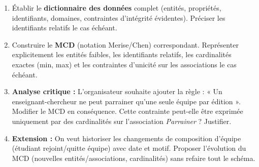 \documentclass[11pt]{article}
\begin{document}
\begin{exercice}
\begin{enumerate}
    \item Établir le \textbf{dictionnaire des données} complet (entités, propriétés, identifiants, domaines, contraintes d'intégrité évidentes). Préciser les identifiants relatifs le cas échéant.
    \item Construire le \textbf{MCD} (notation Merise/Chen) correspondant. Représenter explicitement les entités faibles, les identifiants relatifs, les cardinalités exactes (min, max) et les contraintes d'unicité sur les associations le cas échéant.
    \item \textbf{Analyse critique :} L'organisateur souhaite ajouter la règle : « Un enseignant-chercheur ne peut parrainer qu'une seule équipe par édition ». Modifier le MCD en conséquence. Cette contrainte peut-elle être exprimée uniquement par des cardinalités sur l'association \textit{Parrainer} ? Justifier.
    \item \textbf{Extension :} On veut historiser les changements de composition d'équipe (étudiant rejoint/quitte équipe) avec date et motif. Proposer l'évolution du MCD (nouvelles entités/associations, cardinalités) sans refaire tout le schéma.
\end{enumerate}
\end{exercice}
\end{document}
